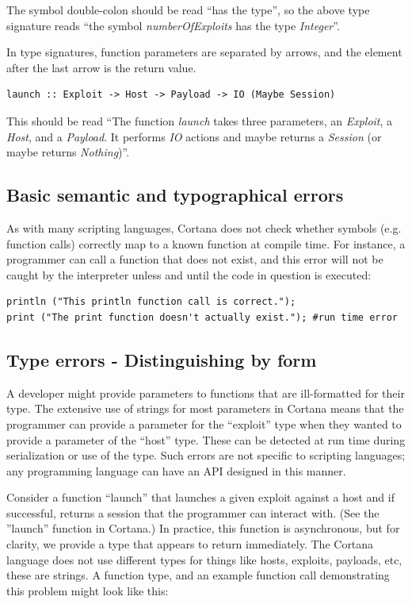 \documentclass[figure,letterpaper,onefignum]{mysiam}
\begin{document}
The symbol double-colon should be read ``has the type'', so the above type signature reads ``the symbol \emph{numberOfExploits} has the type \emph{Integer}''.

In type signatures, function parameters are separated by arrows, and the element after the last arrow is the return value.

\begin{verbatim}
launch :: Exploit -> Host -> Payload -> IO (Maybe Session)
\end{verbatim}

This should be read ``The function \emph{launch} takes three parameters, an \emph{Exploit}, a \emph{Host}, and a \emph{Payload}. It performs \emph{IO} actions and maybe returns a \emph{Session} (or maybe returns \emph{Nothing})''.

\subsection{Basic semantic and typographical errors}
As with many scripting languages, Cortana does not check whether symbols (e.g. function calls) correctly map to a known function at compile time. For instance, a programmer can call a function that does not exist, and this error will not be caught by the interpreter unless and until the code in question is executed:

\begin{verbatim}
println ("This println function call is correct.");
print ("The print function doesn't actually exist."); #run time error
\end{verbatim}

\subsection{Type errors - Distinguishing by form}
A developer might provide parameters to functions that are ill-formatted for their type. The extensive use of strings for most parameters in Cortana means that the programmer can provide a parameter for the ``exploit'' type when they wanted to provide a parameter of the ``host'' type. These can be detected at run time during serialization or use of the type. Such errors are not specific to scripting languages; any programming language can have an API designed in this manner.

Consider a function ``launch'' that launches a given exploit against a host and if successful, returns a session that the programmer can interact with. (See the ''launch'' function in Cortana.) In practice, this function is asynchronous, but for clarity, we provide a type that appears to return immediately. The Cortana language does not use different types for things like hosts, exploits, payloads, etc, these are strings. A function type, and an example function call demonstrating this problem might look like this:
\end{document}
